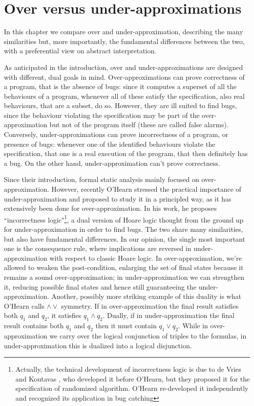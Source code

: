 \chapter{Over versus under-approximations}
In this chapter we compare over and under-approximation, describing the many similarities but, more importantly, the fundamental differences between the two, with a preferential view on abstract interpretation.

As anticipated in the introduction, over and under-approximations are designed with different, dual goals in mind.
Over-approximations can prove correctness of a program, that is the absence of bugs: since it computes a superset of all the behaviours of a program, whenever all of these satisfy the specification, also real behaviours, that are a subset, do so. However, they are ill suited to find bugs, since the behaviour violating the specification may be part of the over-approximation but not of the program itself (these are called false alarms).
Conversely, under-approximations can prove incorrectness of a program, or presence of bugs: whenever one of the identified behaviours violate the specification, that one is a real execution of the program, that then definitely has a bug. On the other hand, under-approximation can't prove correctness.

Since their introduction, formal static analysis mainly focused on over-approximation. However, recently O'Hearn \cite{ohearn-incorrectness-logic} stressed the practical importance of under-approximation and proposed to study it in a principled way, as it has extensively been done for over-approximation.
In his work, he proposes ``incorrectness logic"\footnote{Actually, the technical development of incorrectness logic is due to de Vries and Koutavas \cite{de-vries-koutavas-reverse-hoare-logic}, who developed it before O'Hearn, but they proposed it for the specification of randomized algorithm. O'Hearn re-developed it independently and recognized its application in bug catching}, a dual version of Hoare logic thought from the ground up for under-approximation in order to find bugs. The two share many similarities, but also have fundamental differences. In our opinion, the single most important one is the consequence rule, where implications are reversed in under-approximation with respect to classic Hoare logic. In over-approximation, we're allowed to weaken the post-condition, enlarging the set of final states because it remains a sound over-approximation; in under-approximation we can strengthen it, reducing possible final states and hence still guaranteeing the under-approximation.
Another, possibly more striking example of this duality is what O'Hearn calls $\land \lor$ symmetry. If in over-approximation the final result satisfies both $q_1$ and $q_2$, it satisfies $q_1 \land q_2$. Dually, if in under-approximation the final result contains both $q_1$ and $q_2$ then it must contain $q_1 \lor q_2$. While in over-approximation we carry over the logical conjunction of triples to the formulas, in under-approximation this is dualized into a logical disjunction.

